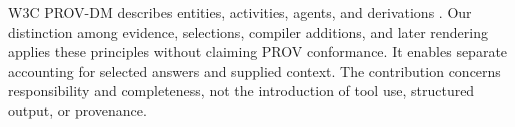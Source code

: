 W3C PROV-DM describes entities, activities, agents, and derivations \cite{prov}. Our distinction among evidence, selections, compiler additions, and later rendering applies these principles without claiming PROV conformance. It enables separate accounting for selected answers and supplied context. The contribution concerns responsibility and completeness, not the introduction of tool use, structured output, or provenance.
